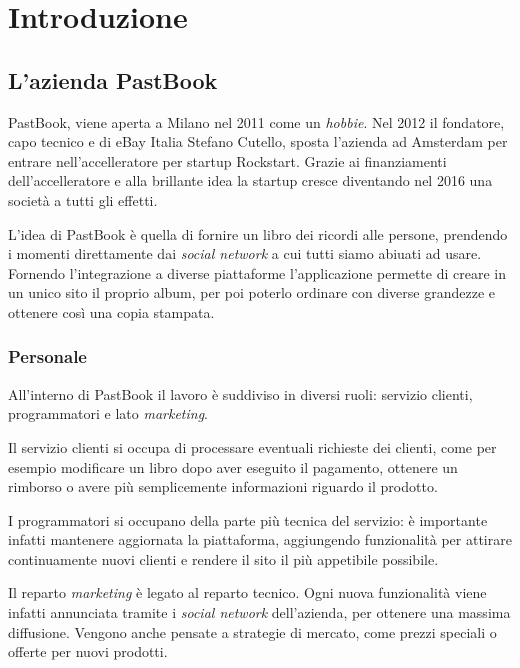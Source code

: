 \mainmatter

\chapter{Introduzione}

\section{L'azienda PastBook}

PastBook, viene aperta a Milano nel 2011 come un \textit{hobbie}. Nel 2012 il
fondatore, capo tecnico e  di eBay Italia
Stefano Cutello, sposta l'azienda ad Amsterdam per entrare nell'accelleratore
per \gls{startup} Rockstart. Grazie ai finanziamenti dell'accelleratore e alla
brillante idea la \gls{startup} cresce diventando nel 2016 una società a tutti
gli effetti.

L'idea di PastBook è quella di fornire un libro dei ricordi alle
persone, prendendo i momenti direttamente dai \textit{social network} a cui
tutti siamo abiuati ad usare. Fornendo l'integrazione a diverse piattaforme
l'applicazione permette di creare in un unico sito il proprio album, per poi
poterlo ordinare con diverse grandezze e ottenere così una copia stampata.

\subsection{Personale}

All'interno di PastBook il lavoro è suddiviso in diversi ruoli: servizio
clienti, programmatori e lato \textit{marketing}.

Il servizio clienti si occupa di processare eventuali richieste dei clienti,
come per esempio modificare un libro dopo aver eseguito il pagamento, ottenere
un rimborso o avere più semplicemente informazioni riguardo il prodotto.

I programmatori si occupano della parte più tecnica del servizio: è importante
infatti mantenere aggiornata la piattaforma, aggiungendo funzionalità
per attirare continuamente nuovi clienti e rendere il sito il più appetibile
possibile.

Il reparto \textit{marketing} è legato al reparto tecnico. Ogni nuova
funzionalità viene infatti annunciata tramite i \textit{social network}
dell'azienda, per ottenere una massima diffusione. Vengono anche pensate a
strategie di mercato, come prezzi speciali o offerte per nuovi prodotti.

